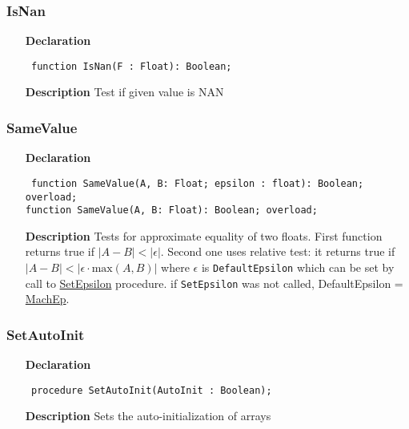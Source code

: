 \documentclass[12pt,a4paper,oneside]{report}
\newcommand{\lmath}[1]{   %
	\marginpar{\vspace{#1} 
		\begin{flushright}
			LMath
	\end{flushright} }
}
\newcommand{\declarationitem}[1]{\textbf{#1}}
\newcommand{\descriptiontitle}[1]{\textbf{#1}}
\newcommand{\code}[1]{\texttt{#1}}
\begin{document}
\subsubsection{IsNan}\label{utypes-IsNan}
\lmath{-24pt}
\begin{itemize}
	\item[\declarationitem{Declaration}\hfill]
	\begin{flushleft}
		\code{
			function IsNan(F : Float): Boolean;}
	\end{flushleft}
	\item[\descriptiontitle{Description}]
	Test if given value is NAN
\end{itemize}
\subsubsection{SameValue}
\lmath{-24pt}
\label{utypes-SameValue}
\begin{itemize}\item[\declarationitem{Declaration}\hfill]
	\begin{flushleft}
		\code{
			function SameValue(A, B: Float; epsilon : float): Boolean; overload;\\
			function SameValue(A, B: Float): Boolean; overload;}
	\end{flushleft}
	\item[\descriptiontitle{Description}]
	Tests for approximate equality of two floats. First function returns true if $\left| A-B \right| < \left| \epsilon \right| $. Second one uses relative test: it returns true if $\left| A-B \right| < \left| \epsilon \cdot \mathrm{max}(A,B) \right| $ where $\epsilon$ is \code{DefaultEpsilon} which can be set by call to \hyperref[utypes-SetZeroEpsilon]{\mbox{SetEpsilon}} procedure. if \code{SetEpsilon} was not called, DefaultEpsilon = \hyperref[utypes-MachEp]{MachEp}.
\end{itemize}
\subsubsection{SetAutoInit}
\label{utypes-SetAutoInit}
\begin{itemize}\item[\declarationitem{Declaration}\hfill]
	\begin{flushleft}
		\code{
			procedure SetAutoInit(AutoInit : Boolean);}
	\end{flushleft}
	\par
	\item[\descriptiontitle{Description}]
	Sets the auto{-}initialization of arrays
	
\end{itemize}
\end{document}
